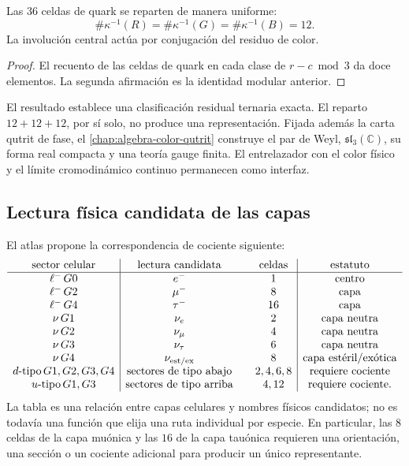 \begin{proposition}
\label{prop:color-atlas}
Las \(36\) celdas de quark se reparten de manera uniforme:
\[
 \#\kappa^{-1}(R)=\#\kappa^{-1}(G)=\#\kappa^{-1}(B)=12.
\]
La involución central actúa por conjugación del residuo de color.
\end{proposition}
\begin{proof}
El recuento de las celdas de quark en cada clase de \(r-c\bmod3\) da doce
elementos. La segunda afirmación es la identidad modular anterior.
\end{proof}

El resultado establece una clasificación residual ternaria exacta. El reparto
\(12+12+12\), por sí solo, no produce una representación. Fijada además la
carta qutrit de fase, el \cref{chap:algebra-color-qutrit} construye el par de
Weyl, \(\mathfrak{sl}_3(\mathbb C)\), su forma real compacta y una teoría gauge
finita. El entrelazador con el color físico y el límite cromodinámico continuo
permanecen como interfaz.

\subsection{Lectura física candidata de las capas}

El atlas propone la correspondencia de cociente siguiente:
\[
\begin{array}{c|c@{\qquad}c|c}
\text{sector celular}&\text{lectura candidata}&\text{celdas}&\text{estatuto}\\ \hline
\ell^-\,G0&e^-&1&\text{centro}\\
\ell^-\,G2&\mu^-&8&\text{capa}\\
\ell^-\,G4&\tau^-&16&\text{capa}\\
\nu\,G1&\nu_e&2&\text{capa neutra}\\
\nu\,G2&\nu_\mu&4&\text{capa neutra}\\
\nu\,G3&\nu_\tau&6&\text{capa neutra}\\
\nu\,G4&\nu_{\rm est/ex}&8&\text{capa estéril/exótica}\\
d\text{-tipo}\,G1,G2,G3,G4&\text{sectores de tipo abajo}&2,4,6,8&\text{requiere cociente}\\
u\text{-tipo}\,G1,G3&\text{sectores de tipo arriba}&4,12&\text{requiere cociente}.
\end{array}
\]
La tabla es una relación entre capas celulares y nombres físicos candidatos;
no es todavía una función que elija una ruta individual por especie. En
particular, las \(8\) celdas de la capa muónica y las \(16\) de la capa tauónica
requieren una orientación, una sección o un cociente adicional para producir
un único representante.

